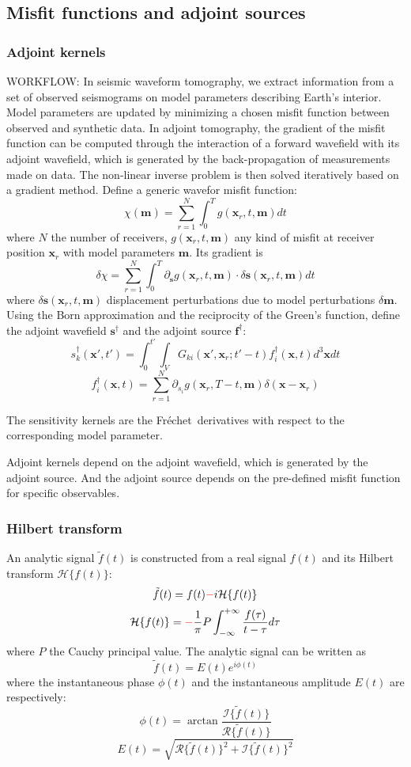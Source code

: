 \documentclass{article}
\newcommand{\mbf}[1]{\mathbf{#1}}
\newcommand{\myno}[1]{{\color{blue}#1}}
\newcommand{\mynno}[1]{{\color{red}#1}}
\newcommand{\mycR}{\mathcal{R}}
\newcommand{\mycI}{\mathcal{I}}
\newcommand{\mycH}{\mathcal{H}}
\newcommand{\Frechet}{Fr\'{e}chet~}
\begin{document}
\subsection{Misfit functions and adjoint sources}
\subsubsection{Adjoint kernels}
\myno{WORKFLOW:} In seismic waveform tomography, we extract information from a set of observed seismograms on model parameters describing Earth's interior. Model parameters are updated by minimizing a chosen misfit function between observed and synthetic data. In adjoint tomography, the gradient of the misfit function can be computed through the interaction of a forward wavefield with its adjoint wavefield, which is generated by the back-propagation of measurements made on data. The non-linear inverse problem is then solved iteratively based on a gradient method.
Define a generic wavefor misfit function:
\[ \chi(\mbf m)=\sum_{r=1}^N\int_0^Tg(\mbf x_r,t,\mbf m)dt \]
where $N$ the number of receivers, $g(\mbf x_r,t,\mbf m)$ any kind of misfit at receiver position $\mbf x_r$ with model parameters $\mbf m$. Its gradient is
\[ \delta\chi=\sum_{r=1}^N\int_0^T\partial_{\mbf s}g(\mbf x_r,t,\mbf m)\cdot\delta\mbf s(\mbf x_r,t,\mbf m)dt \]
where $\delta\mbf s(\mbf x_r,t,\mbf m)$ displacement perturbations due to model perturbations $\delta\mbf m$. Using the Born approximation and the reciprocity of the Green's function, define the adjoint wavefield $\mbf s^\dagger$ and the adjoint source $\mbf f^\dagger$:
\[ s_k^\dagger(\mbf x',t')=\int_0^{t'}\int_VG_{ki}(\mbf x',\mbf x_r;t'-t)f_i^\dagger(\mbf x,t)d^3\mbf xdt \]
\[ f_i^\dagger(\mbf x,t)=\sum_{r=1}^N\partial_{s_i}g(\mbf x_r,T-t,\mbf m)\delta(\mbf x-\mbf x_r) \]\par
The sensitivity kernels are the \Frechet derivatives with respect to the corresponding model parameter.\par
Adjoint kernels depend on the adjoint wavefield, which is generated by the adjoint source. And the adjoint source depends on the pre-defined misfit function for specific observables.\par
\subsubsection{Hilbert transform}
An analytic signal $\tilde f(t)$ is constructed from a real signal $f(t)$ and its Hilbert transform $\mycH\{f(t)\}$:
\[ \tilde f(t)=f(t) \mynno{-} i\mycH\{f(t)\} \]
\[ \mycH\{f(t)\}= \mynno{-} \frac{1}{\pi}P\int_{-\infty}^{+\infty}\frac{f(\tau)}{t-\tau}d\tau \]
where $P$ the Cauchy principal value. The analytic signal can be written as
\[ \tilde f(t)=E(t)e^{i\phi(t)} \]
where the instantaneous phase $\phi(t)$ and the instantaneous amplitude $E(t)$ are respectively:
\[ \phi(t)=\arctan\frac{\mycI\{\tilde f(t)\}}{\mycR\{\tilde f(t)\}} \]
\[ E(t)=\sqrt{\mycR\{\tilde f(t)\}^2+\mycI\{\tilde f(t)\}^2} \]\par
\end{document}
